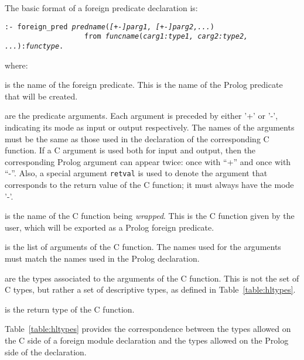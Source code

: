 The basic format of a foreign predicate declaration is:
\begin{center}
{\tt :- foreign\_pred \emph{predname}(\emph{[+-]parg1,
  [+-]parg2,...})\\
~~~~~~~~~~~~~~~~~~~from \emph{funcname}(\emph{carg1:type1, carg2:type2,
  ...}):\emph{functype}.
}
\end{center}
where:

\begin{description}

 is the name of the foreign predicate. This is the name
of the Prolog predicate that will be created.

 are the predicate arguments. Each argument is
preceded by either '+' or '-', indicating its mode as input or output
respectively. The names of the arguments must be the same as those used in
the declaration of the corresponding C function. If a C argument is used
both for input and output, then the corresponding Prolog argument can
appear twice: once with ``+'' and once with ``-''.  Also, a special
argument \texttt{retval} is used to denote the argument that corresponds to
the return value of the C function; it must always have the mode '-'.

 is the name of the C function being
\emph{wrapped}. This is the C function given by the user, which will
be exported as a Prolog foreign predicate.

 is the list of arguments of the C function. The
names used for the arguments must match the names used in the Prolog
declaration.

 are the types associated to the arguments of
the C function. This is not the set of C types, but rather a set of
descriptive types, as defined in Table~\ref{table:hltypes}.

 is the return type of the C function.

\end{description}

Table~\ref{table:hltypes} provides the correspondence between the types
allowed on the C side of a foreign module declaration and the types allowed
on the Prolog side of the declaration.

